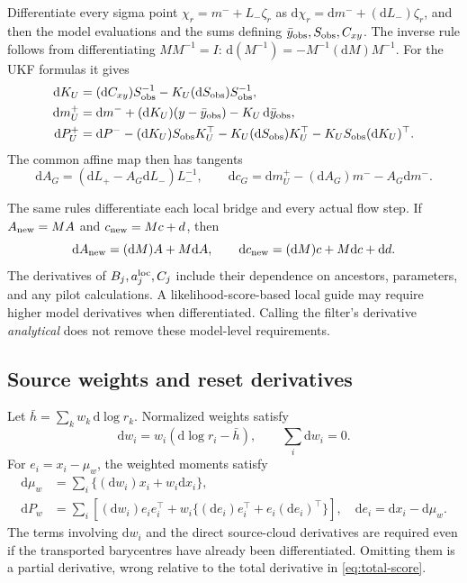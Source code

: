 \documentclass[11pt,a4paper]{article}
\newcommand{\dd}{\mathrm d}
\begin{document}
Differentiate every sigma point
\(\chi_r=m^-+L_-\zeta_r\) as
\(\dd\chi_r=\dd m^-+(\dd L_-)\zeta_r\), and then the model evaluations
and the sums defining \(\bar y_{\rm obs},S_{\rm obs},C_{xy}\).
The inverse rule follows from differentiating \(MM^{-1}=I\):
\(\dd(M^{-1})=-M^{-1}(\dd M)M^{-1}\).
For the UKF formulas it gives
\begin{align}
\label{eq:ukf-tangent}
 \dd K_U&=(\dd C_{xy})S_{\rm obs}^{-1}
                -K_U(\dd S_{\rm obs})S_{\rm obs}^{-1},\\
 \dd m_U^+&=\dd m^-+(\dd K_U)(y-\bar y_{\rm obs})
                   -K_U\,\dd\bar y_{\rm obs},\nonumber\\
 \dd P_U^+&=\dd P^--(\dd K_U)S_{\rm obs}K_U^\top
                    -K_U(\dd S_{\rm obs})K_U^\top
                    -K_US_{\rm obs}(\dd K_U)^\top.\nonumber
\end{align}
The common affine map then has tangents
\begin{equation}
\label{eq:global-tangent}
 \dd A_G=(\dd L_+-A_G\dd L_-)L_-^{-1},\qquad
 \dd c_G=\dd m_U^+-(\dd A_G)m^- -A_G\dd m^-.
\end{equation}

The same rules differentiate each local bridge and every actual flow
step. If \(A_{\rm new}=MA\) and \(c_{\rm new}=Mc+d\), then
\[
 \dd A_{\rm new}=(\dd M)A+M\dd A,\qquad
 \dd c_{\rm new}=(\dd M)c+M\dd c+\dd d .
\]
The derivatives of \(B_j,a_j^{\rm loc},C_j\) include their dependence on
ancestors, parameters, and any pilot calculations. A likelihood-score-based
local guide may require higher model derivatives when differentiated.
Calling the filter's derivative \emph{analytical} does not remove these
model-level requirements.

\subsection{Source weights and reset derivatives}

Let \(\bar h=\sum_kw_k\,\dd\log r_k\). Normalized weights satisfy
\begin{equation}
\label{eq:weight-tangent}
 \dd w_i=w_i(\dd\log r_i-\bar h),\qquad \sum_i\dd w_i=0.
\end{equation}
For \(e_i=x_i-\mu_w\), the weighted moments satisfy
\begin{align}
\label{eq:weighted-moment-tangent}
 \dd\mu_w
   &=\sum_i\{(\dd w_i)x_i+w_i\dd x_i\},\\
 \dd P_w
   &=\sum_i\left[
      (\dd w_i)e_ie_i^\top+
      w_i\{(\dd e_i)e_i^\top+e_i(\dd e_i)^\top\}\right],
 \quad \dd e_i=\dd x_i-\dd\mu_w.\nonumber
\end{align}
The terms involving \(\dd w_i\) and the direct source-cloud derivatives
are required even if the transported barycentres have already been
differentiated. Omitting them is a partial derivative, wrong relative to
the total derivative in \eqref{eq:total-score}.
\end{document}
